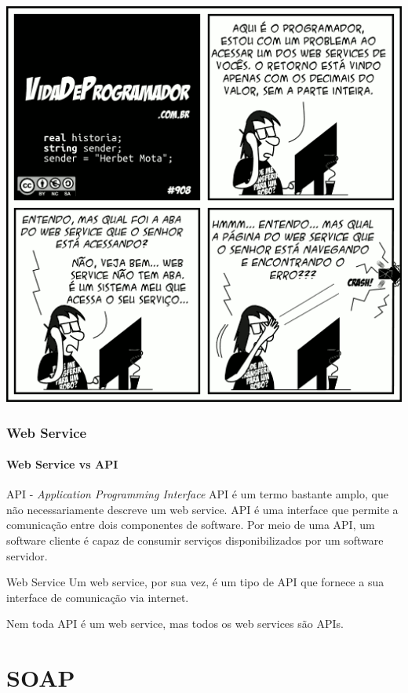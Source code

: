 \documentclass[
	9pt, %
	t, %
]{beamer}
\newcommand{\yellowbox}[1]{\colorbox{yellow!75}{#1}}
\begin{document}
\begin{frame}[plain, c]
	\centering
	\includegraphics[width=0.7\linewidth]{vdp_ws2.png}
\end{frame}

\begin{frame}
	\frametitle{Web Service}
	\framesubtitle{Web Service vs API}

	\begin{block}{API - \textit{Application Programming Interface}}
		API é um termo bastante amplo, que não necessariamente descreve um web service. 
		API é uma interface que permite a comunicação entre dois componentes de software. 
		Por meio de uma API, um software cliente é capaz de consumir serviços disponibilizados por um software servidor.
	\end{block}

	\begin{block}{Web Service}
		Um web service, por sua vez, é um tipo de API que fornece a sua interface de comunicação \yellowbox{via internet}.
	\end{block}

	\bigskip

	\begin{center}
		\yellowbox{Nem toda API é um web service, mas todos os web services são APIs.}
	\end{center}

\end{frame}


\section{SOAP}
\end{document}
